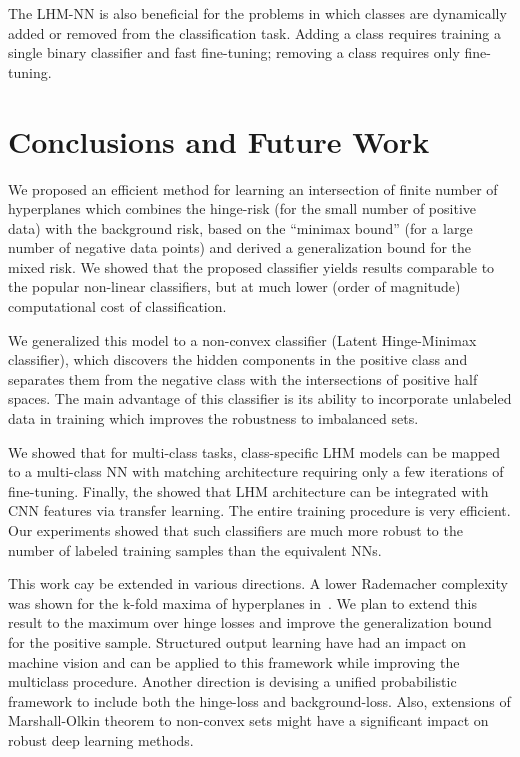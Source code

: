 \documentclass[twoside,11pt]{article}
\begin{document}
The LHM-NN is also beneficial for the problems in which classes are dynamically added or removed from the classification task. Adding a class requires training a single binary classifier and fast fine-tuning; removing a class requires only fine-tuning.
\section{Conclusions and Future Work}
We proposed an efficient method for learning an intersection of finite number of hyperplanes which combines the hinge-risk (for the small number of positive data) with the background risk, based on the ``minimax bound'' (for a large number of negative data points) and derived a generalization bound for the mixed risk. We showed that the proposed classifier yields results comparable to the popular non-linear classifiers, but at much lower (order of magnitude) computational cost of classification. %
%

We generalized this model to a non-convex classifier (Latent Hinge-Minimax classifier), which discovers the hidden components in the positive class and separates them from the negative class with the intersections of positive half spaces. The main advantage of this classifier is its ability to incorporate unlabeled data in training which improves the robustness to imbalanced sets.

We showed that for multi-class tasks, class-specific LHM models can be mapped to a multi-class NN with matching architecture requiring only a few iterations of fine-tuning. Finally, the showed that LHM architecture can be integrated with CNN features via transfer learning. The entire training procedure is very efficient. Our experiments showed that such classifiers are much more robust to the number of labeled training samples than the equivalent NNs.

This work cay be extended in various directions. A lower Rademacher complexity was shown for the k-fold maxima of hyperplanes in~\cite{Kontorovich18}. We plan to extend this result to the maximum over hinge losses and improve the generalization bound for the positive sample. Structured output learning have had an impact on machine vision and can be applied to this framework while improving the multiclass procedure. Another direction is devising a unified probabilistic framework to include both the hinge-loss and background-loss. Also, extensions of Marshall-Olkin theorem to non-convex sets might have a significant impact on robust deep learning methods.


\vskip 0.2in

\end{document}
